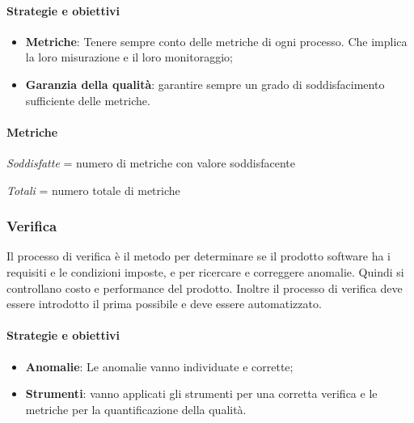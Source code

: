             \paragraph{Strategie e obiettivi}
            \begin{itemize}
                \item \textbf{Metriche}: Tenere sempre conto delle metriche di ogni processo. Che implica la loro misurazione e il loro monitoraggio;
                \item \textbf{Garanzia della qualità}: garantire sempre un grado di soddisfacimento sufficiente delle metriche.
            \end{itemize}
            
            \paragraph{Metriche}
            \hphantom{}
            \def\productquality{
                {   Percentuale di metriche soddisfatte,
                    $\frac{Soddisfatte}{Totali}$,
                    $ \geq 60 \%$,
                    $ \geq 80 \% $
                },
            }
            
            
\textit{Soddisfatte} = numero di metriche con valore soddisfacente

\textit{Totali} = numero totale di metriche
 
            \newpage
            \subsubsection{Verifica}
            Il processo di verifica è il metodo per determinare se il prodotto software ha i requisiti e le condizioni imposte, e per ricercare e correggere anomalie. Quindi si controllano costo e performance del prodotto. Inoltre il processo di verifica deve essere introdotto il prima possibile e deve essere automatizzato.
            
            \paragraph{Strategie e obiettivi}
            \begin{itemize}
                \item \textbf{Anomalie}: Le anomalie vanno individuate e corrette;
                \item \textbf{Strumenti}: vanno applicati gli strumenti per una corretta verifica e le metriche per la quantificazione della qualità.
            \end{itemize}
            
